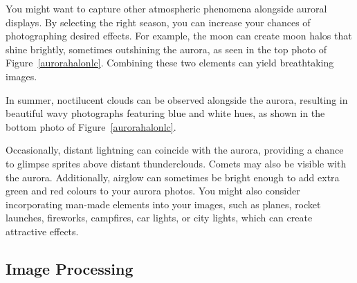 \documentclass{article}
\newcommand{\contributed}[1]{%
    \par\noindent
    \begingroup
    \setlength{\leftskip}{1em}%
    \itshape
    Contributors: #1
    \par
    \endgroup
    \vspace{0.5em}
}
\begin{document}
You might want to capture other atmospheric phenomena alongside auroral displays. By selecting the right season, you can increase your chances of photographing desired effects. For example, the moon can create moon halos that shine brightly, sometimes outshining the aurora, as seen in the top photo of Figure~\ref{aurorahalonlc}. Combining these two elements can yield breathtaking images.

In summer, noctilucent clouds can be observed alongside the aurora, resulting in beautiful wavy photographs featuring blue and white hues, as shown in the bottom photo of Figure~\ref{aurorahalonlc}.

Occasionally, distant lightning can coincide with the aurora, providing a chance to glimpse sprites above distant thunderclouds. Comets may also be visible with the aurora. Additionally, airglow can sometimes be bright enough to add extra green and red colours to your aurora photos. You might also consider incorporating man-made elements into your images, such as planes, rocket launches, fireworks, campfires, car lights, or city lights, which can create attractive effects.




\subsection{Image Processing}
\end{document}
